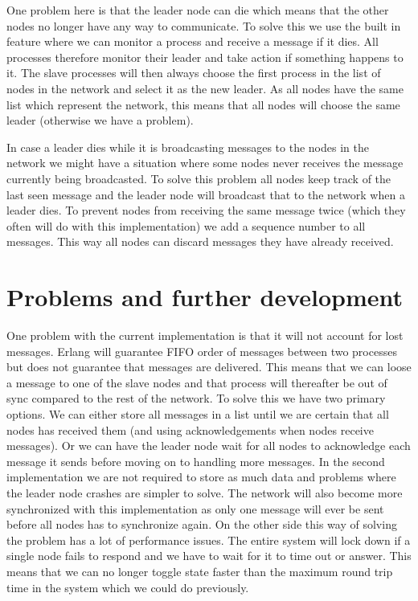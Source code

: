 One problem here is that the leader node can die which means that the other nodes no longer have any way to communicate. To solve this we use the built in feature where we can monitor a process and receive a message if it dies. All processes therefore monitor their leader and take action if something happens to it. The slave processes will then always choose the first process in the list of nodes in the network and select it as the new leader. As all nodes have the same list which represent the network, this means that all nodes will choose the same leader (otherwise we have a problem). 

In case a leader dies while it is broadcasting messages to the nodes in the network we might have a situation where some nodes never receives the message currently being broadcasted. To solve this problem all nodes keep track of the last seen message and the leader node will broadcast that to the network when a leader dies. To prevent nodes from receiving the same message twice (which they often will do with this implementation) we add a sequence number to all messages. This way all nodes can discard messages they have already received.

\section{Problems and further development}
One problem with the current implementation is that it will not account for lost messages. Erlang will guarantee FIFO order of messages between two processes but does not guarantee that messages are delivered. This means that we can loose a message to one of the slave nodes and that process will thereafter be out of sync compared to the rest of the network. To solve this we have two primary options. We can either store all messages in a list until we are certain that all nodes has received them (and using acknowledgements when nodes receive messages). Or we can have the leader node wait for all nodes to acknowledge each message it sends before moving on to handling more messages. In the second implementation we are not required to store as much data and problems where the leader node crashes are simpler to solve. The network will also become more synchronized with this implementation as only one message will ever be sent before all nodes has to synchronize again. On the other side this way of solving the problem has a lot of performance issues. The entire system will lock down if a single node fails to respond and we have to wait for it to time out or answer. This means that we can no longer toggle state faster than the maximum round trip time in the system which we could do previously.
